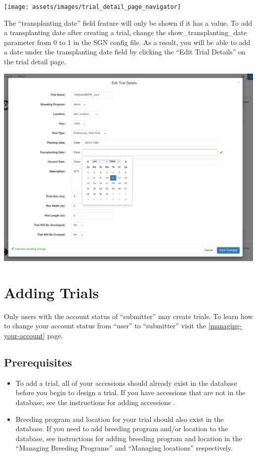 \documentclass[
  12pt,
]{book}
\begin{document}
\begin{center}\texttt{[image: assets/images/trial\_detail\_page\_navigator]} \end{center}

The ``transplanting date'' field feature will only be shown if it has a value. To add a transplanting date after creating a trial, change the show\_transplanting\_date parameter from 0 to 1 in the SGN config file. As a result, you will be able to add a date under the transplanting date field by clicking the ``Edit Trial Details'' on the trial detail page.

\begin{center}\includegraphics[width=0.95\linewidth]{assets/images/add_transplanting_date} \end{center}

\hypertarget{adding-trials}{%
\section{Adding Trials}\label{adding-trials}}

Only users with the account status of ``submitter'' may create trials. To learn how to change your account status from ``user'' to ``submitter'' visit the \ref{managing-your-account} page.

\hypertarget{prerequisites}{%
\subsection{Prerequisites}\label{prerequisites}}

\begin{itemize}
\item
  To add a trial, all of your accessions should already exist in the database before you begin to design a trial. If you have accessions that are not in the database, see the instructions for adding accessions .
\item
  Breeding program and location for your trial should also exist in the database. If you need to add breeding program and/or location to the database, see instructions for adding breeding program and location in the ``Managing Breeding Programs'' and ``Managing locations'' respectively.
\end{itemize}
\end{document}
